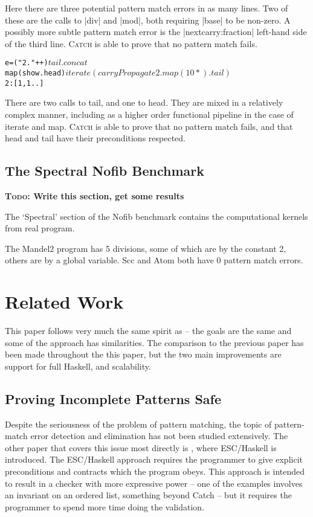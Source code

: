 \documentclass[preprint]{sigplanconf}
\let\cite=\citep
\newcommand{\C}[1]{\textsf{#1}}
\newcommand{\catch}{\textsc{Catch}}
\newcommand{\todo}[1]{\textbf{\textsc{Todo:} #1}}
\newenvironment{code}{\begin{alltt}\small}{\end{alltt}}
\begin{document}
Here there are three potential pattern match errors in as many lines. Two of these are the calls to |div| and |mod|, both requiring |base| to be non-zero. A possibly more subtle pattern match error is the |nextcarry:fraction| left-hand side of the third line. \catch{} is able to prove that no pattern match fails.

\begin{code}
e =  ("2."++) $
     tail . concat $
     map (show.head) $
     iterate (carryPropagate 2 . map (10*) . tail) $
     2:[1,1..]
\end{code}

There are two calls to \C{tail}, and one to \C{head}. They are mixed in a relatively complex manner, including as a higher order functional pipeline in the case of \C{iterate} and \C{map}. \catch{} is able to prove that no pattern match fails, and that \C{head} and \C{tail} have their preconditions respected.

\subsection{The Spectral Nofib Benchmark}
\label{sec:spectral}

\todo{Write this section, get some results}

The `Spectral' section of the Nofib benchmark contains the computational kernels from real program.

The Mandel2 program has 5 divisions, some of which are by the constant 2, others are by a global variable. Scc and Atom both have 0 pattern match errors.


\section{Related Work}
\label{sec:related}

This paper follows very much the same spirit as \cite{me:catch_tfp} -- the goals are the same and some of the approach has similarities. The comparison to the previous paper has been made throughout the this paper, but the two main improvements are support for full Haskell, and scalability.

\subsection{Proving Incomplete Patterns Safe}

Despite the seriousness of the problem of pattern matching, the topic of pattern-match error detection and elimination has not been studied extensively. The other paper that covers this issue most directly is \citep{esc_haskell}, where ESC/Haskell is introduced. The ESC/Haskell approach requires the programmer to give explicit preconditions and contracts which the program obeys. This approach is intended to result in a checker with more expressive power -- one of the examples involves an invariant on an ordered list, something beyond Catch -- but it requires the programmer to spend more time doing the validation.
\end{document}
